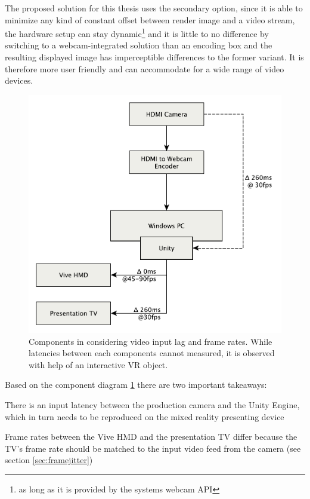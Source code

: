 The proposed solution for this thesis uses the secondary option, since it is 
able to minimize any kind of constant offset between render image and a video 
stream, the hardware setup can stay dynamic\footnote{as long as it is provided 
by the systems webcam API} and it is little to no difference by switching to a 
webcam-integrated solution than an encoding box and the resulting displayed 
image has imperceptible differences to the former variant. It is therefore more 
user friendly and can accommodate for a wide range of video devices.

\begin{figure}[htb]
	\centering
	\includegraphics[width=.85\textwidth]{gfx/FPS-Timing-Components.pdf}
	\caption{Components in considering video input lag and frame rates. While 
	latencies between each components cannot measured, it is observed with help 
	of an interactive VR object.}
	\label{fig:offsets:components}
\end{figure}

Based on the component diagram \ref{fig:offsets:components} there are two 
important takeaways: 

\begin{my_list}
	\item There is an input latency between the production camera and the Unity 
	Engine, which in turn needs to be reproduced on the mixed reality 
	presenting device
	\item Frame rates between the Vive HMD and the presentation TV differ 
	because the TV's frame rate should be matched to the input video feed from 
	the camera (see section \ref{sec:framejitter})
\end{my_list}

